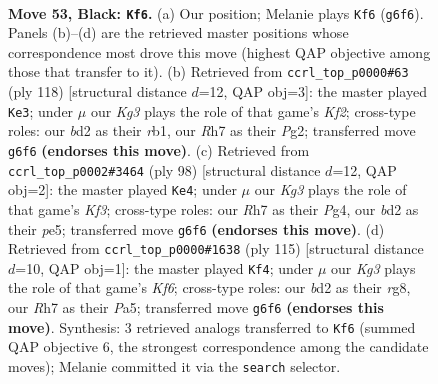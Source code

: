 \documentclass[11pt]{article}
\begin{document}
\clearpage

\begin{figure}[p]\centering
\begin{subfigure}{0.46\textwidth}\centering
\resizebox{\linewidth}{!}{%
\newchessgame
\chessboard[
  setfen={2R5/7r/r5k1/1p6/3PK3/1p6/3B4/8 b - - 1 53},
  showmover=false,
  pgfstyle=straightmove, color=movearrow, markmove={g6-f6}
]}
\caption{}
\end{subfigure}\hfill
\begin{subfigure}{0.46\textwidth}\centering
\resizebox{\linewidth}{!}{%
\newchessgame
\chessboard[
  setfen={8/5R2/8/6kp/4P3/8/5KP1/1r6 w - - 0 60},
  showmover=false,
  pgfstyle=straightmove, color=movearrow, markmove={f2-e3}
]}
\caption{}
\end{subfigure}
\\[4pt]
\begin{subfigure}{0.46\textwidth}\centering
\resizebox{\linewidth}{!}{%
\newchessgame
\chessboard[
  setfen={8/6pk/1r6/4p3/6PP/R4K2/8/8 w - - 3 50},
  showmover=false,
  pgfstyle=straightmove, color=movearrow, markmove={f3-e4}
]}
\caption{}
\end{subfigure}\hfill
\begin{subfigure}{0.46\textwidth}\centering
\resizebox{\linewidth}{!}{%
\newchessgame
\chessboard[
  setfen={6R1/8/8/p2p3P/3P4/4rk2/1K6/8 b - - 0 58},
  showmover=false,
  pgfstyle=straightmove, color=movearrow, markmove={f3-f4}
]}
\caption{}
\end{subfigure}
\caption{\textbf{Move 53, Black: \texttt{Kf6}.} (a) Our position; Melanie plays \texttt{Kf6} (\texttt{g6f6}). Panels (b)--(d) are the retrieved master positions whose correspondence most drove this move (highest QAP objective among those that transfer to it). (b) Retrieved from \texttt{ccrl\_top\_p0000\#63} (ply 118) [structural distance $d$=12, QAP obj=3]: the master played \texttt{Ke3}; under $\mu$ our \emph{Kg3} plays the role of that game's \emph{Kf2}; cross-type roles: our \emph{b}d2 as their \emph{r}b1, our \emph{R}h7 as their \emph{P}g2; transferred move \texttt{g6f6} \textbf{(endorses this move)}. (c) Retrieved from \texttt{ccrl\_top\_p0002\#3464} (ply 98) [structural distance $d$=12, QAP obj=2]: the master played \texttt{Ke4}; under $\mu$ our \emph{Kg3} plays the role of that game's \emph{Kf3}; cross-type roles: our \emph{R}h7 as their \emph{P}g4, our \emph{b}d2 as their \emph{p}e5; transferred move \texttt{g6f6} \textbf{(endorses this move)}. (d) Retrieved from \texttt{ccrl\_top\_p0000\#1638} (ply 115) [structural distance $d$=10, QAP obj=1]: the master played \texttt{Kf4}; under $\mu$ our \emph{Kg3} plays the role of that game's \emph{Kf6}; cross-type roles: our \emph{b}d2 as their \emph{r}g8, our \emph{R}h7 as their \emph{P}a5; transferred move \texttt{g6f6} \textbf{(endorses this move)}. Synthesis: 3 retrieved analogs transferred to \texttt{Kf6} (summed QAP objective 6, the strongest correspondence among the candidate moves); Melanie committed it via the \texttt{search} selector.}
\label{fig:thought-m105}
\end{figure}
\end{document}

